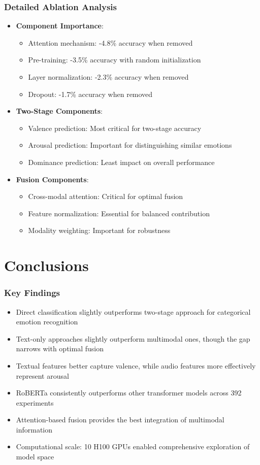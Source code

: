 \begin{frame}
\frametitle{Detailed Ablation Analysis}
\begin{itemize}
    \item \textbf{Component Importance}:
    \begin{itemize}
        \item Attention mechanism: -4.8\% accuracy when removed
        \item Pre-training: -3.5\% accuracy with random initialization
        \item Layer normalization: -2.3\% accuracy when removed
        \item Dropout: -1.7\% accuracy when removed
    \end{itemize}
    \item \textbf{Two-Stage Components}:
    \begin{itemize}
        \item Valence prediction: Most critical for two-stage accuracy
        \item Arousal prediction: Important for distinguishing similar emotions
        \item Dominance prediction: Least impact on overall performance
    \end{itemize}
    \item \textbf{Fusion Components}:
    \begin{itemize}
        \item Cross-modal attention: Critical for optimal fusion
        \item Feature normalization: Essential for balanced contribution
        \item Modality weighting: Important for robustness
    \end{itemize}
\end{itemize}
\end{frame}

\section{Conclusions}

\begin{frame}
\frametitle{Key Findings}
\begin{itemize}
    \item Direct classification slightly outperforms two-stage approach for categorical emotion recognition
    \item Text-only approaches slightly outperform multimodal ones, though the gap narrows with optimal fusion
    \item Textual features better capture valence, while audio features more effectively represent arousal
    \item RoBERTa consistently outperforms other transformer models across \alert{392 experiments}
    \item Attention-based fusion provides the best integration of multimodal information
    \item Computational scale: \alert{10 H100 GPUs} enabled comprehensive exploration of model space
\end{itemize}
\end{frame}

